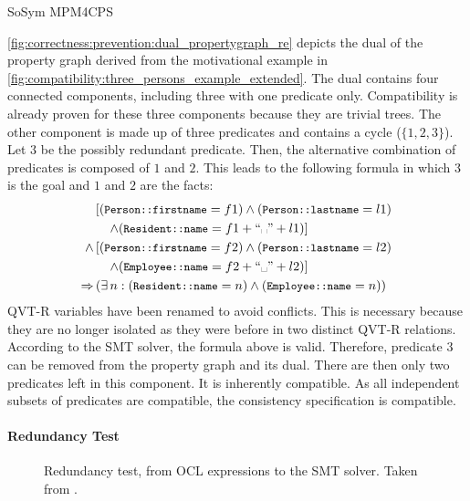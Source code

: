 \begin{copiedFrom}{SoSym MPM4CPS}
\begin{example}
\autoref{fig:correctness:prevention:dual_propertygraph_re} depicts the dual of the property graph derived from the motivational example in \autoref{fig:compatibility:three_persons_example_extended}. The dual contains four connected components, including three with one predicate only. Compatibility is already proven for these three components because they are trivial trees. The other component is made up of three predicates and contains a cycle ($\{1, 2, 3\}$).
Let $3$ be the possibly redundant predicate. Then, the alternative combination of predicates is composed of $1$ and $2$. This leads to the following formula in which $3$ is the goal and $1$ and $2$ are the facts:
\begin{align*}
    &\left[(\propdisplay{\small Person::firstname} = f1) \wedge (\propdisplay{\small Person::lastname} = l1)\right.\\
    &\left.\formulaskip \wedge (\propdisplay{\small Resident::name} = f1 + ``\text{\textvisiblespace}" + l1)\right]\\
    \wedge & \left[(\propdisplay{\small Person::firstname} = f2) \wedge (\propdisplay{\small Person::lastname} = l2)\right.\\
    &\left.\formulaskip \wedge (\propdisplay{\small Employee::name} = f2 + ``\text{\textvisiblespace}" + l2)\right]\\
    \Rightarrow & \left(\exists n : (\propdisplay{\small Resident::name} = n) \wedge (\propdisplay{\small Employee::name} = n)\right)
\end{align*}
QVT-R variables have been renamed to avoid conflicts. This is necessary because they are no longer isolated as they were before in two distinct QVT-R relations. According to the SMT solver, the formula above is valid. Therefore, predicate $3$ can be removed from the property graph and its dual. There are then only two predicates left in this component. It is inherently compatible. As all independent subsets of predicates are compatible, the consistency specification is compatible.
\end{example}
    
\paragraph{Redundancy Test}

\begin{figure*}
    \centering
    \resizebox{\linewidth}{!}{}
    \caption{Redundancy test, from OCL expressions to the SMT solver. Taken from .}
    \label{fig:correctness:prevention:redundancytest}
\end{figure*}


\end{copiedFrom}

